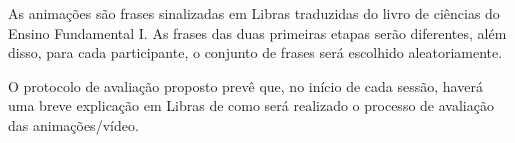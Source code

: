 \documentclass[a4paper,11pt,titlepage,singlespacing]{article}
\begin{document}
As animações são frases sinalizadas em Libras traduzidas do livro de ciências do Ensino Fundamental I. As frases das duas primeiras etapas serão diferentes, além disso, para cada participante, o conjunto de frases será escolhido aleatoriamente.
















O protocolo de avaliação proposto prevê que, no início de cada sessão, haverá uma breve explicação em Libras de como será realizado o processo de avaliação das animações/vídeo.%

\end{document}
